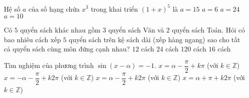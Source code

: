 \begin{ex}%
	Hệ số $a$ của số hạng chứa $x^3$ trong khai triển $(1+x)^5$ là
	\choice
	{$a=15$}
	{$a=6$}
	{$a=24$}
	{\True $a=10$}
\end{ex}
\begin{ex}%
	Có $5$ quyển sách khác nhau gồm $3$ quyển sách Văn và $2$ quyển sách Toán. Hỏi có bao nhiêu cách xếp $5$ quyển sách trên kệ sách dài (xếp hàng ngang) sao cho tất cả quyển sách cùng môn đứng cạnh nhau?
	\choice
	{$12$ cách}
	{\True $24$ cách}
	{$120$ cách}
	{$16$ cách}
\end{ex}
\begin{ex}%
	Tìm nghiệm của phương trình $\sin(x-\alpha)=-1$.
	\choice
	{$x=\alpha-\dfrac{\pi}{2}+k\pi$ (với $k\in \mathbb{Z}$)}
	{$x=-\alpha-\dfrac{\pi}{2}+k2\pi$ (với $k\in \mathbb{Z}$)}
	{\True $x=\alpha-\dfrac{\pi}{2}+k2\pi$ (với $k\in \mathbb{Z}$)}
	{$x=\alpha+\pi +k2\pi$ (với $k\in \mathbb{Z}$)}
\end{ex}

